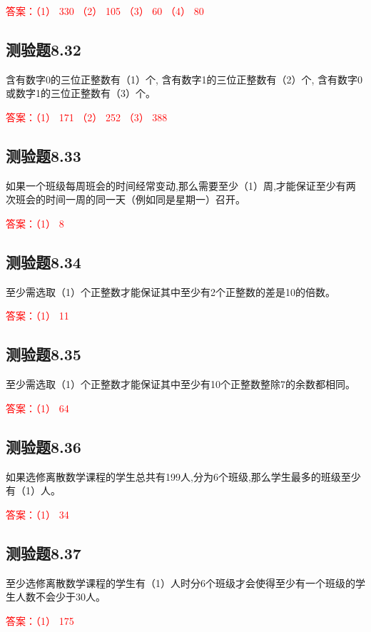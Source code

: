 \documentclass[UTF8, heading=true]{ctexart}
\begin{document}
\textcolor{red}{答案：（1） 330 （2） 105 （3） 60 （4） 80}


\subsection{测验题8.32}

含有数字0的三位正整数有（1）个,
含有数字1的三位正整数有（2）个,
含有数字0或数字1的三位正整数有（3）个。

\textcolor{red}{答案：（1） 171 （2） 252 （3） 388}

\subsection{测验题8.33}

如果一个班级每周班会的时间经常变动,那么需要至少（1）周,才能保证至少有两次班会的时间一周的同一天（例如同是星期一）召开。

\textcolor{red}{答案：（1） 8}


\subsection{测验题8.34}

至少需选取（1）个正整数才能保证其中至少有2个正整数的差是10的倍数。

\textcolor{red}{答案：（1） 11}

\subsection{测验题8.35}
至少需选取（1）个正整数才能保证其中至少有10个正整数整除7的余数都相同。

\textcolor{red}{答案：（1） 64}

\subsection{测验题8.36}
如果选修离散数学课程的学生总共有199人,分为6个班级,那么学生最多的班级至少有（1）人。

\textcolor{red}{答案：（1） 34}

\subsection{测验题8.37}

至少选修离散数学课程的学生有（1）人时分6个班级才会使得至少有一个班级的学生人数不会少于30人。

\textcolor{red}{答案：（1） 175}
\end{document}
